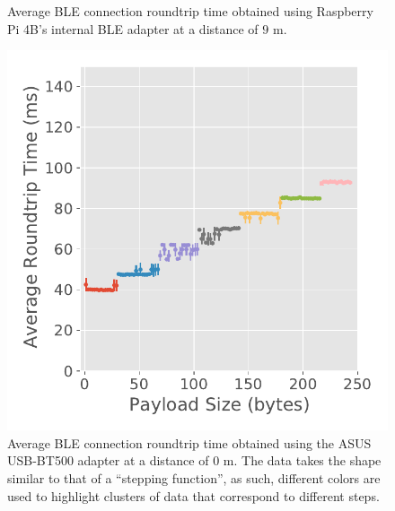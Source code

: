 \begin{figure}[H]
\begin{minipage}{0.45\linewidth}
        \caption[Average \acs{BLE} connection roundtrip time obtained using the Raspberry Pi 4B's internal \acs{BLE} adapter at a distance of 9 m.]{Average \acs{BLE} connection roundtrip time obtained using Raspberry Pi 4B's internal \acs{BLE} adapter at a distance of $9\text{ m}$.}
        \label{fig:ble-roundtrip-hci1-9m}
    \end{minipage}
\end{figure}

\begin{figure}[H]
    \centering
    \begin{minipage}{0.45\linewidth}
        \centering
        \includegraphics[width=\linewidth]{images/ble-roundtrip-hci0-0cm.pdf}
        \caption[Average \acs{BLE} connection roundtrip time obtained using the ASUS USB-BT500 adapter at a distance of 0 m.]{Average \acs{BLE} connection roundtrip time obtained using the ASUS USB-BT500 adapter at a distance of $0\text{ m}$. The data takes the shape similar to that of a ``stepping function'', as such, different colors are used to highlight clusters of data that correspond to different steps.}
        \label{fig:ble-roundtrip-hci0-0m}
    \end{minipage}
    \hspace{0.05\linewidth}
    \begin{minipage}{0.45\linewidth}

\end{minipage}
\end{figure}

